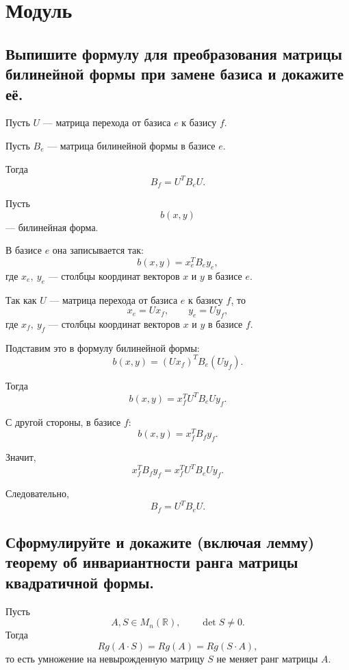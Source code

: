 \section{Модуль}

\subsection{Выпишите формулу для преобразования матрицы билинейной формы при замене базиса и докажите её.}
\begin{theorem}
    Пусть $U$ --- матрица перехода от базиса $e$ к базису $f$.
    
    Пусть $B_e$ --- матрица билинейной формы в базисе $e$.
    
    Тогда
    \[
        B_f = U^T B_e U.
    \]
\end{theorem}

\begin{Proof}
    Пусть
    \[
        b(x,y)
    \]
    --- билинейная форма.
    
    В базисе $e$ она записывается так:
    \[
        b(x,y) = x_e^T B_e y_e,
    \]
    где $x_e,\ y_e$ --- столбцы координат векторов $x$ и $y$ в базисе $e$.
    
    Так как $U$ --- матрица перехода от базиса $e$ к базису $f$, то
    \[
        x_e = Ux_f,
        \qquad
        y_e = Uy_f,
    \]
    где $x_f,\ y_f$ --- столбцы координат векторов $x$ и $y$ в базисе $f$.
    
    Подставим это в формулу билинейной формы:
    \[
        b(x,y)
        =
        (Ux_f)^T B_e (Uy_f).
    \]
    
    Тогда
    \[
        b(x,y)
        =
        x_f^T U^T B_e U y_f.
    \]
    
    С другой стороны, в базисе $f$:
    \[
        b(x,y) = x_f^T B_f y_f.
    \]
    
    Значит,
    \[
        x_f^T B_f y_f
        =
        x_f^T U^T B_e U y_f.
    \]
    
    Следовательно,
    \[
        B_f = U^T B_e U.
    \]
\end{Proof}

\subsection{Сформулируйте и докажите \textnormal{(включая лемму)} теорему об инвариантности ранга матрицы квадратичной формы.}

\begin{lemma}
    Пусть
    \[
        A,S \in M_n(\mathbb{R}),
        \qquad
        \det S \neq 0.
    \]
    Тогда
    \[
        Rg(A\cdot S) = Rg(A) = Rg(S\cdot A),
    \]
    то есть умножение на невырожденную матрицу $S$ не меняет ранг матрицы $A$.
\end{lemma}

